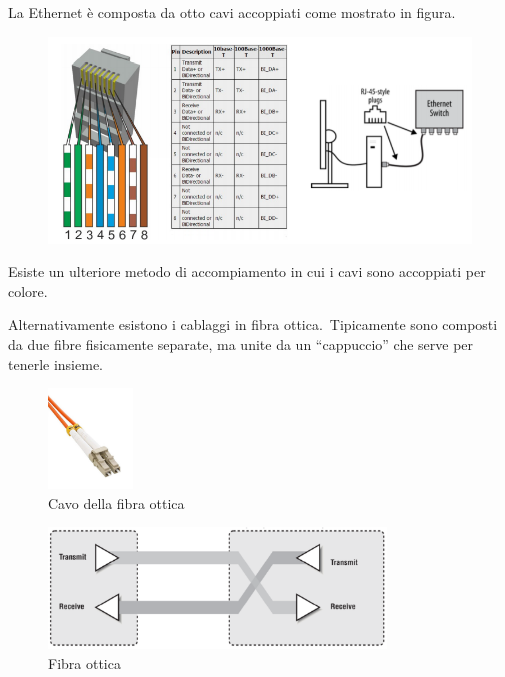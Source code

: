 La Ethernet è composta da otto cavi accoppiati come mostrato in figura.\

\begin{figure}[H]
    \centering
    \includegraphics[width=\textwidth]{immagini/Ethernet_pinout.png}
\end{figure}

\noindent Esiste un ulteriore metodo di accompiamento in cui i cavi sono accoppiati per colore.

Alternativamente esistono i cablaggi in fibra ottica.\
Tipicamente sono composti da due fibre fisicamente separate, ma unite da un ``cappuccio'' che serve per tenerle insieme.

\begin{figure}[H]
    \centering
    \includegraphics[width=0.2\textwidth]{immagini/FibraOttica_cavo.jpg}
    \caption*{Cavo della fibra ottica}

\end{figure}

\begin{figure}[H]
    \centering
    \includegraphics[width=0.8\textwidth]{immagini/FibraOttica.png}
    \caption*{Fibra ottica}
\end{figure}

